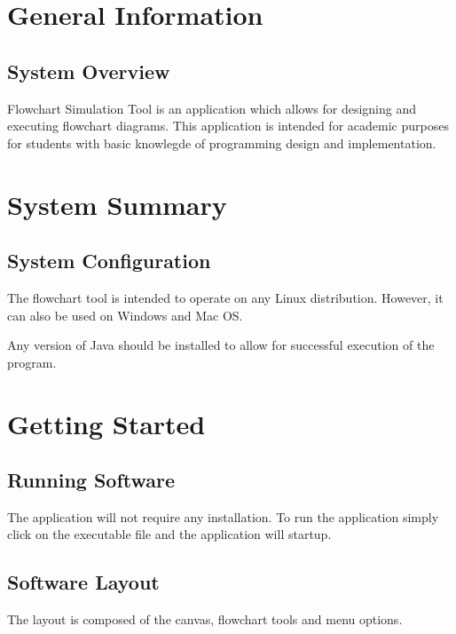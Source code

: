 \documentclass[11pt,a4paper,titlepage]{article}
\begin{document}

\newpage
\tableofcontents
{}
\newpage
{}
\section{General Information}
	\subsection{System Overview}
	
		Flowchart Simulation Tool is an application which allows for 				designing and executing flowchart diagrams. This application is 		intended for academic purposes for students with basic knowlegde of 		programming design and implementation. 
	
\section{System Summary}
	\subsection{System Configuration}
	
		The flowchart tool is intended to operate on any Linux 						distribution. However, it can also be used on Windows and 			Mac OS.
		
		Any version of Java should be installed to allow for successful execution of the program. 
	
\section{Getting Started}
	\subsection{Running Software}
		The application will not require any installation. To run the 			application simply click on the executable file and the 		application will startup.
		
		\subsection{Software Layout}
		The layout is composed of the canvas, flowchart tools and menu options.
		
\end{document}
